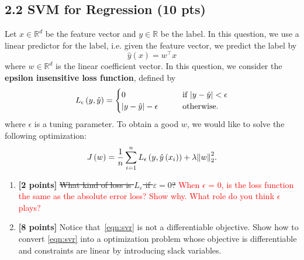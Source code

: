 \documentclass{article}
\begin{document}
\subsection*{2.2 SVM for Regression (10 pts)}
Let $x \in \mathbb{R}^d$ be the feature vector and $y \in \mathbb{R}$ be the label.
In this question, we use a linear predictor for the label, i.e. given the feature vector, we predict the label by \[
\hat{y}\left(x\right) = w^\top x
\] where $w \in\mathbb{R}^d$ is the linear coefficient vector.
In this question, we consider the \textbf{epsilon insensitive loss function}, defined by\begin{align*}
L_{\epsilon}\left(y,\hat{y}\right) = \begin{cases}
0 \qquad &\text{if } \abs{y-\hat{y}} < \epsilon \\
\abs{y-\hat{y}} - \epsilon \qquad &\text{otherwise}.
\end{cases}
\end{align*} where $\epsilon$ is a tuning parameter.
To obtain a good $w$, we would like to solve the following optimization:
\begin{align}
J\left(w\right) = \frac{1}{n}\sum_{i=1}^{n}L_\epsilon\left(y,\hat{y}\left(x_i\right)\right) + \lambda\norm{w}_2^2. \label{eqn:svr}
\end{align}
\begin{enumerate}
\item\textbf{[2 points]} \sout{What kind of loss is $L_ε$ if $ε = 0$?} \textcolor{red}{ When $\epsilon$ = 0, is the loss function the same as the absolute error loss? Show why. What role do you think $\epsilon$ plays?}  \\


\item\textbf{[8 points]} Notice that~\eqref{eqn:svr} is not a differentiable objective.
Show how to convert \eqref{eqn:svr} into a optimization problem whose objective is differentiable and constraints are linear by introducing slack variables. \\

\end{enumerate}

\newpage
\end{document}
